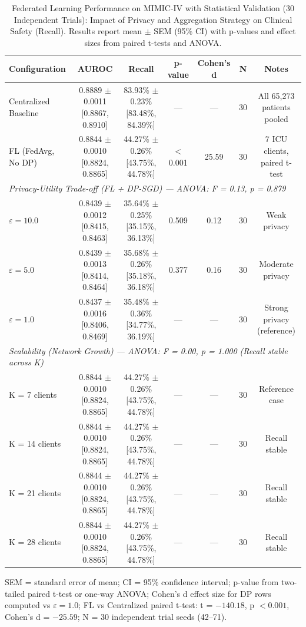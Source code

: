 \begin{table}[htbp]
\caption{Federated Learning Performance on MIMIC-IV with Statistical Validation (30 Independent Trials): Impact of Privacy and Aggregation Strategy on Clinical Safety (Recall). Results report mean $\pm$ SEM (95\% CI) with p-values and effect sizes from paired t-tests and ANOVA.}
\begin{center}
\begin{tabular}{lcccccc}
\toprule
\textbf{Configuration} & \textbf{AUROC} & \textbf{Recall} & \textbf{p-value} & \textbf{Cohen's d} & \textbf{N} & \textbf{Notes} \\
\midrule
Centralized Baseline & 0.8889 $\pm$ 0.0011 [0.8867, 0.8910] & 83.93\% $\pm$ 0.23\% [83.48\%, 84.39\%] & --- & --- & 30 & All 65,273 patients pooled \\
FL (FedAvg, No DP)   & 0.8844 $\pm$ 0.0010 [0.8824, 0.8865] & 44.27\% $\pm$ 0.26\% [43.75\%, 44.78\%] & $<$0.001 & 25.59 & 30 & 7 ICU clients, paired t-test \\
\midrule
\multicolumn{7}{l}{\textit{Privacy-Utility Trade-off (FL + DP-SGD) --- ANOVA: F = 0.13, p = 0.879}} \\
\quad $\varepsilon = 10.0$ & 0.8439 $\pm$ 0.0012 [0.8415, 0.8463] & 35.64\% $\pm$ 0.25\% [35.15\%, 36.13\%] & 0.509 & 0.12 & 30 & Weak privacy \\
\quad $\varepsilon = 5.0$  & 0.8439 $\pm$ 0.0013 [0.8414, 0.8464] & 35.68\% $\pm$ 0.26\% [35.18\%, 36.18\%] & 0.377 & 0.16 & 30 & Moderate privacy \\
\quad $\varepsilon = 1.0$  & 0.8437 $\pm$ 0.0016 [0.8406, 0.8469] & 35.48\% $\pm$ 0.36\% [34.77\%, 36.19\%] & --- & --- & 30 & Strong privacy (reference) \\
\midrule
\multicolumn{7}{l}{\textit{Scalability (Network Growth) --- ANOVA: F = 0.00, p = 1.000 (Recall stable across K)}} \\
\quad K = 7  clients & 0.8844 $\pm$ 0.0010 [0.8824, 0.8865] & 44.27\% $\pm$ 0.26\% [43.75\%, 44.78\%] & --- & --- & 30 & Reference case \\
\quad K = 14 clients & 0.8844 $\pm$ 0.0010 [0.8824, 0.8865] & 44.27\% $\pm$ 0.26\% [43.75\%, 44.78\%] & --- & --- & 30 & Recall stable \\
\quad K = 21 clients & 0.8844 $\pm$ 0.0010 [0.8824, 0.8865] & 44.27\% $\pm$ 0.26\% [43.75\%, 44.78\%] & --- & --- & 30 & Recall stable \\
\quad K = 28 clients & 0.8844 $\pm$ 0.0010 [0.8824, 0.8865] & 44.27\% $\pm$ 0.26\% [43.75\%, 44.78\%] & --- & --- & 30 & Recall stable \\
\bottomrule
\end{tabular}
\end{center}
\label{tab:performance_statistical}
\footnotesize{SEM = standard error of mean; CI = 95\% confidence interval; p-value from two-tailed paired t-test or one-way ANOVA; Cohen's d effect size for DP rows computed vs $\varepsilon=1.0$; FL vs Centralized paired t-test: t = $-140.18$, p $<0.001$, Cohen's d = $-25.59$; N = 30 independent trial seeds (42--71).}
\end{table}